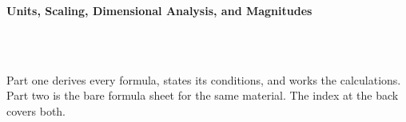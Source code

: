



\makeindex[title={Index of This Volume},columns=2,intoc]

\begin{titlepage}\thispagestyle{empty}
\vspace*{0.14\textheight}
\noindent{\color{tiercore}\rule{\textwidth}{5pt}}\\[3pt]
\noindent{\color{bioline}\rule{\textwidth}{1pt}}\\[26pt]
\\[12pt]
\noindent\begin{minipage}{\textwidth}\raggedright
{\sffamily\bfseries\fontsize{28}{32}\selectfont\color{bioink}%
 \hyphenchar{} Units, Scaling, Dimensional Analysis, and Magnitudes\par}\end{minipage}\\[16pt]
\noindent{\color{biogreen}\rule{\textwidth}{1.4pt}}\\[10pt]
\noindent\begin{minipage}{\textwidth}\raggedright
{\fontsize{10.5}{14}\selectfont\color{biogreen}%
Part one derives every formula, states its conditions, and works the calculations. Part two is the
bare formula sheet for the same material. The index at the back covers both.\par}\end{minipage}
\vfill
\noindent{\color{bioline}\rule{\textwidth}{1pt}}\\[3pt]
\noindent{\color{tiercore}\rule{\textwidth}{5pt}}
\end{titlepage}
\tableofcontents
\clearpage
{}
\clearpage
\printindex

